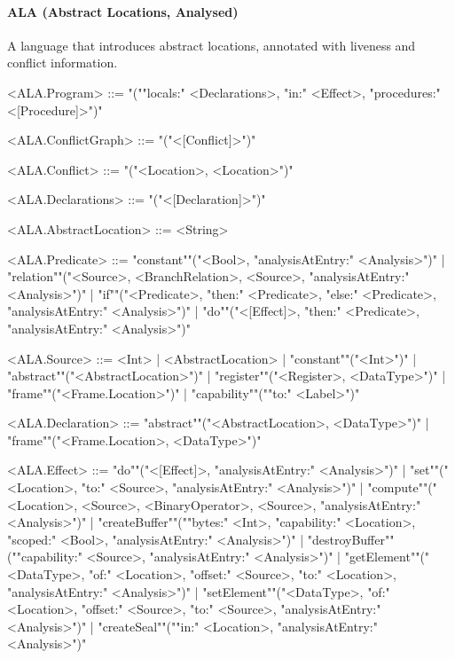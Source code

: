 \documentclass[main.tex]{subfiles}
\begin{document}
\paragraph{ ALA (Abstract Locations, Analysed) } A language that introduces abstract locations, annotated with liveness and conflict information.
\begin{grammar}
	\footnotesize
				<ALA.Program> ::=
							"(""locals:" <Declarations>, "in:" <Effect>, "procedures:" <[Procedure]>")"
				\par
				<ALA.ConflictGraph> ::=
							"("<[Conflict]>")"
				\par
				<ALA.Conflict> ::=
							"("<Location>, <Location>")"
				\par
				<ALA.Declarations> ::=
							"("<[Declaration]>")"
				\par
				<ALA.AbstractLocation> ::=
						<String>
				\par
				<ALA.Predicate> ::=
						"constant""("<Bool>, "analysisAtEntry:" <Analysis>")"
						| "relation""("<Source>, <BranchRelation>, <Source>, "analysisAtEntry:" <Analysis>")"
						| "if""("<Predicate>, "then:" <Predicate>, "else:" <Predicate>, "analysisAtEntry:" <Analysis>")"
						| "do""("<[Effect]>, "then:" <Predicate>, "analysisAtEntry:" <Analysis>")"
				\par
				<ALA.Source> ::=
						<Int> |
								<AbstractLocation> |
						"constant""("<Int>")"
						| "abstract""("<AbstractLocation>")"
						| "register""("<Register>, <DataType>")"
						| "frame""("<Frame.Location>")"
						| "capability""(""to:" <Label>")"
				\par
				<ALA.Declaration> ::=
						"abstract""("<AbstractLocation>, <DataType>")"
						| "frame""("<Frame.Location>, <DataType>")"
				\par
				<ALA.Effect> ::=
						"do""("<[Effect]>, "analysisAtEntry:" <Analysis>")"
						| "set""("<Location>, "to:" <Source>, "analysisAtEntry:" <Analysis>")"
						| "compute""("<Location>, <Source>, <BinaryOperator>, <Source>, "analysisAtEntry:" <Analysis>")"
						| "createBuffer""(""bytes:" <Int>, "capability:" <Location>, "scoped:" <Bool>, "analysisAtEntry:" <Analysis>")"
						| "destroyBuffer""(""capability:" <Source>, "analysisAtEntry:" <Analysis>")"
						| "getElement""("<DataType>, "of:" <Location>, "offset:" <Source>, "to:" <Location>, "analysisAtEntry:" <Analysis>")"
						| "setElement""("<DataType>, "of:" <Location>, "offset:" <Source>, "to:" <Source>, "analysisAtEntry:" <Analysis>")"
						| "createSeal""(""in:" <Location>, "analysisAtEntry:" <Analysis>")"

\end{grammar}
\end{document}
